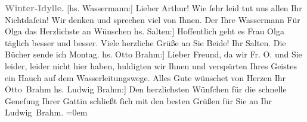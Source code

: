 \begin{ledgroupsized}[t]{13cm}
           \noindent{}\centering{}{\pb}\textcolor{gray}{\textbf{Winter-Idylle.}}\pend
           \pstart
           {\pb}{[}hs. Wassermann:{]} Lieber Arthur! Wie ſehr leid tut uns allen Ihr Nichtdaſein! Wir
               denken und sprechen viel von Ihnen.\pend
           \pstart Der Ihre \spacefill\mbox{Wassermann}\pend{}\pstart
           \introOben{}Für Olga das Herzlichste an
                  Wünschen\introOben{}\pend
           \pstart
           \noindent{}{[}hs. Salten:{]} Hoffentlich geht es Frau Olga täglich besser und besser. Viele herzliche Grüße an Sie
               Beide!\pend
           \pstart Ihr \spacefill\mbox{Salten.}\pend{}\pstart
           \noindent{}Die Bücher sende ich Montag.\pend
           \pstart
           \noindent{}{[}hs. Otto Brahm:{]} Lieber Freund, da wir Fr. O.
               und Sie leider, leider nicht hier haben, huldigten wir Ihnen und verspürten Ihres
               Geistes ein Hauch auf dem Wasserleitungswege. Alles Gute wünschet von Herzen\pend
           \pstart Ihr \spacefill\mbox{Otto Brahm}\pend{}\pstart
           \noindent{}{[}hs. Ludwig Brahm:{]} Den herzlichsten Wünſchen für die schnelle Geneſung
               Ihrer Gattin schließt ſich mit den besten
               Grüßen für Sie an\pend
           \pstart
           Ihr{\\[\baselineskip]}\spacefill\mbox{Ludwig Brahm.}\pend
           \leftskip=0em{}
         
         \endnumbering{}\end{ledgroupsized}  \newcommand{\dateiname}{L02578}\newcommand{\titel}{Felix Salten, Jakob Wassermann, Otto Brahm, Ludwig Brahm an Arthur Schnitzler, 21. 12. [1907?]}\newcommand{\editorInnen}{Martin Anton Müller}
      